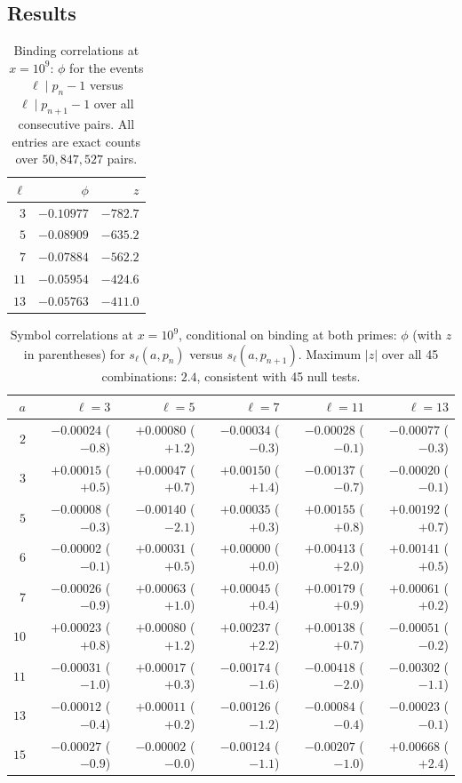 \documentclass[11pt,reqno]{amsart}
\theoremstyle{plain}
\theoremstyle{definition}
\begin{document}
\subsection{Results}

\begin{table}[t]
\centering
\caption{Binding correlations at $x = 10^9$: $\phi$ for the events
$\ell \mid p_n - 1$ versus $\ell \mid p_{n+1} - 1$ over all consecutive
pairs. All entries are exact counts over $50{,}847{,}527$ pairs.}
\label{tab:bind}
\begin{tabular}{rrr}
\toprule
$\ell$ & $\phi$ & $z$ \\
\midrule
$3$  & $-0.10977$  & $-782.7$ \\
$5$  & $-0.08909$  & $-635.2$ \\
$7$  & $-0.07884$  & $-562.2$ \\
$11$ & $-0.05954$ & $-424.6$ \\
$13$ & $-0.05763$ & $-411.0$ \\
\bottomrule
\end{tabular}
\end{table}

\begin{table}[t]
\centering
\caption{Symbol correlations at $x = 10^9$, conditional on binding at both
primes: $\phi$ (with $z$ in parentheses) for
$s_\ell(a, p_n)$ versus $s_\ell(a, p_{n+1})$.
Maximum $|z|$ over all 45 combinations: $2.4$, consistent with 45 null tests.}
\label{tab:sym}
\begin{tabular}{rrrrrr}
\toprule
$a$ & $\ell=3$ & $\ell=5$ & $\ell=7$ & $\ell=11$ & $\ell=13$ \\
\midrule
$2$ & $-0.00024$ ($-0.8$) & $+0.00080$ ($+1.2$) & $-0.00034$ ($-0.3$) & $-0.00028$ ($-0.1$) & $-0.00077$ ($-0.3$) \\
$3$ & $+0.00015$ ($+0.5$) & $+0.00047$ ($+0.7$) & $+0.00150$ ($+1.4$) & $-0.00137$ ($-0.7$) & $-0.00020$ ($-0.1$) \\
$5$ & $-0.00008$ ($-0.3$) & $-0.00140$ ($-2.1$) & $+0.00035$ ($+0.3$) & $+0.00155$ ($+0.8$) & $+0.00192$ ($+0.7$) \\
$6$ & $-0.00002$ ($-0.1$) & $+0.00031$ ($+0.5$) & $+0.00000$ ($+0.0$) & $+0.00413$ ($+2.0$) & $+0.00141$ ($+0.5$) \\
$7$ & $-0.00026$ ($-0.9$) & $+0.00063$ ($+1.0$) & $+0.00045$ ($+0.4$) & $+0.00179$ ($+0.9$) & $+0.00061$ ($+0.2$) \\
$10$ & $+0.00023$ ($+0.8$) & $+0.00080$ ($+1.2$) & $+0.00237$ ($+2.2$) & $+0.00138$ ($+0.7$) & $-0.00051$ ($-0.2$) \\
$11$ & $-0.00031$ ($-1.0$) & $+0.00017$ ($+0.3$) & $-0.00174$ ($-1.6$) & $-0.00418$ ($-2.0$) & $-0.00302$ ($-1.1$) \\
$13$ & $-0.00012$ ($-0.4$) & $+0.00011$ ($+0.2$) & $-0.00126$ ($-1.2$) & $-0.00084$ ($-0.4$) & $-0.00023$ ($-0.1$) \\
$15$ & $-0.00027$ ($-0.9$) & $-0.00002$ ($-0.0$) & $-0.00124$ ($-1.1$) & $-0.00207$ ($-1.0$) & $+0.00668$ ($+2.4$) \\
\bottomrule
\end{tabular}
\end{table}
\end{document}
